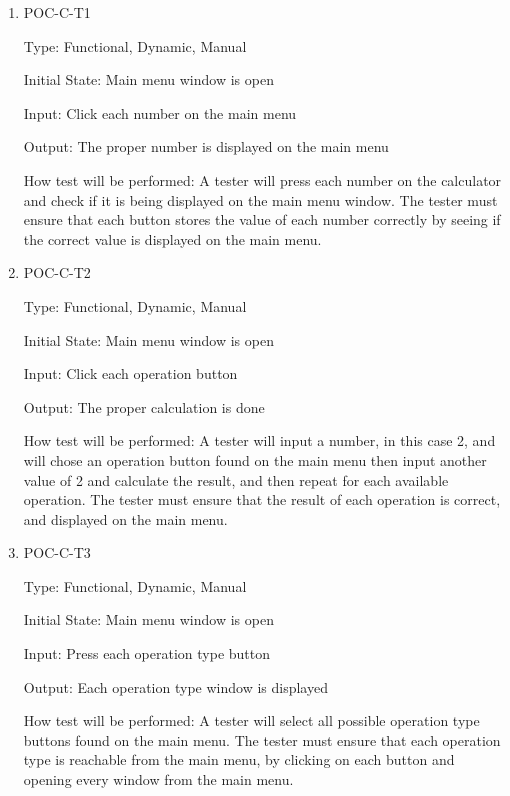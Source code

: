 \documentclass[12pt, titlepage]{article}
\begin{document}
\begin{enumerate}

\item{POC-C-T1\\}

Type: Functional, Dynamic, Manual
					
Initial State: Main menu window is open
					
Input: Click each number on the main menu
					
Output: The proper number is displayed on the main menu
					
How test will be performed: A tester will press each number on the calculator and check if it is being displayed on the main menu window. The tester must ensure that each button stores the value of each number correctly by seeing if the correct value is displayed on the main menu.

\item{POC-C-T2\\}

Type: Functional, Dynamic, Manual
					
Initial State: Main menu window is open
					
Input: Click each operation button
					
Output: The proper calculation is done
					
How test will be performed: A tester will input a number, in this case 2, and will chose an operation button found on the main menu then input another value of 2 and calculate the result, and then repeat for each available operation. The tester must ensure that the result of each operation is correct, and displayed on the main menu.

\item{POC-C-T3\\}

Type: Functional, Dynamic, Manual
					
Initial State: Main menu window is open
					
Input: Press each operation type button
					
Output: Each operation type window is displayed
					
How test will be performed: A tester will select all possible operation type buttons found on the main menu. The tester must ensure that each operation type is reachable from the main menu, by clicking on each button and opening every window from the main menu. 

\end{enumerate}
\end{document}
